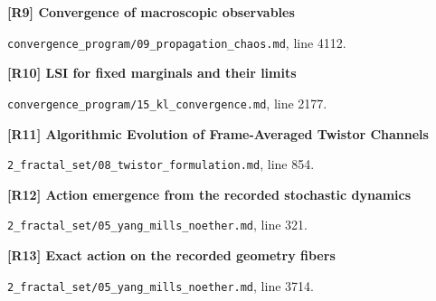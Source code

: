 \documentclass[11pt,a4paper]{article}
\begin{document}
\par\medskip\noindent\begin{minipage}{\linewidth}\textbf{[R9] Convergence of macroscopic observables}\label{src:thm-thermodynamic-limit}\par
{\small\texttt{}\par
\nolinkurl{convergence_program/09_propagation_chaos.md}, line 4112.\par}
\end{minipage}\par

\par\medskip\noindent\begin{minipage}{\linewidth}\textbf{[R10] LSI for fixed marginals and their limits}\label{src:cor-kl-lsi-mean-field-limit}\par
{\small\texttt{}\par
\nolinkurl{convergence_program/15_kl_convergence.md}, line 2177.\par}
\end{minipage}\par

\par\medskip\noindent\begin{minipage}{\linewidth}\textbf{[R11] Algorithmic Evolution of Frame-Averaged Twistor Channels}\label{src:thm-effective-twistor-spectral-meaning}\par
{\small\texttt{}\par
\nolinkurl{2_fractal_set/08_twistor_formulation.md}, line 854.\par}
\end{minipage}\par

\par\medskip\noindent\begin{minipage}{\linewidth}\textbf{[R12] Action emergence from the recorded stochastic dynamics}\label{src:thm-ym-recorded-action-emergence}\par
{\small\texttt{}\par
\nolinkurl{2_fractal_set/05_yang_mills_noether.md}, line 321.\par}
\end{minipage}\par

\par\medskip\noindent\begin{minipage}{\linewidth}\textbf{[R13] Exact action on the recorded geometry fibers}\label{src:thm-ym-native-geometry-fiber-action}\par
{\small\texttt{}\par
\nolinkurl{2_fractal_set/05_yang_mills_noether.md}, line 3714.\par}
\end{minipage}\par
\end{document}
